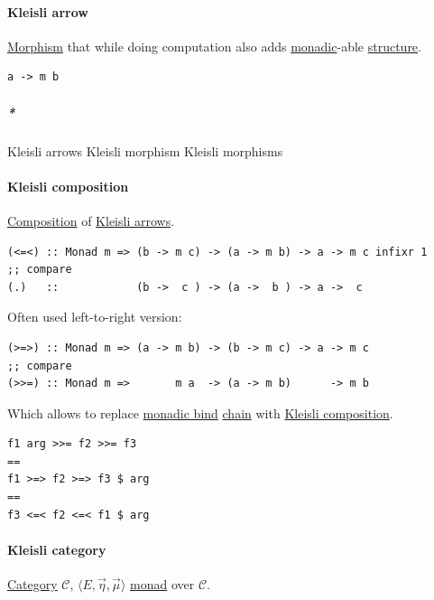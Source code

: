 \documentclass[a4paper,14pt,oneside]{book}
\begin{document}
\paragraph{\label{org799d0b0}Kleisli arrow}
\label{sec:org8f88d6b}
\hyperref[org2147321]{Morphism} that while doing computation also adds \hyperref[org9c0edbc]{monadic}-able \hyperref[org17b2c79]{structure}.

\begin{verbatim}
a -> m b
\end{verbatim}

\subparagraph{\emph{*}}
\label{sec:org91656f2}

\label{org2852a37}Kleisli arrows
\label{org6d26803}Kleisli morphism
\label{org5c0e6df}Kleisli morphisms

\paragraph{\label{orgb351d83}Kleisli composition}
\label{sec:orgfd207ef}
\hyperref[orgab44ae8]{Composition} of \hyperref[org2852a37]{Kleisli arrows}.

\begin{verbatim}
(<=<) :: Monad m => (b -> m c) -> (a -> m b) -> a -> m c infixr 1
;; compare
(.)   ::            (b ->  c ) -> (a ->  b ) -> a ->  c
\end{verbatim}

Often used left-to-right version:

\begin{verbatim}
(>=>) :: Monad m => (a -> m b) -> (b -> m c) -> a -> m c
;; compare
(>>=) :: Monad m =>       m a  -> (a -> m b)      -> m b
\end{verbatim}

Which allows to replace \hyperref[orga43bfcf]{monadic bind} \hyperref[org50678a2]{chain} with \hyperref[orgb351d83]{Kleisli composition}.

\begin{verbatim}
f1 arg >>= f2 >>= f3
==
f1 >=> f2 >=> f3 $ arg
==
f3 <=< f2 <=< f1 $ arg
\end{verbatim}

\paragraph{\label{orgf9da4bd}Kleisli category}
\label{sec:org255341a}
\hyperref[org6f4e20e]{Category} \(\mathcal{C}\), \(〈E, \overrightarrow{\eta}, \overrightarrow{\mu}〉\) \hyperref[orgcfc6146]{monad} over \(\mathcal{C}\).
\end{document}

